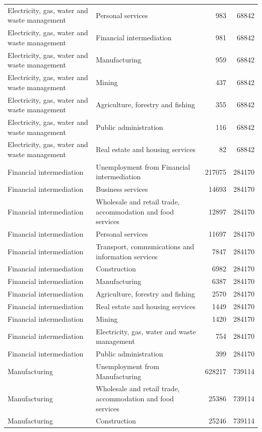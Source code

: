 \begin{longtable}{llrr}
Electricity, gas, water and waste management & Personal services & 983 & 68842 \\
Electricity, gas, water and waste management & Financial intermediation & 981 & 68842 \\
Electricity, gas, water and waste management & Manufacturing & 959 & 68842 \\
Electricity, gas, water and waste management & Mining & 437 & 68842 \\
Electricity, gas, water and waste management & Agriculture, forestry and fishing & 355 & 68842 \\
Electricity, gas, water and waste management & Public administration & 116 & 68842 \\
Electricity, gas, water and waste management & Real estate and housing services & 82 & 68842 \\
Financial intermediation & Unemployment from Financial intermediation & 217075 & 284170 \\
Financial intermediation & Business services & 14693 & 284170 \\
Financial intermediation & Wholesale and retail trade, accommodation and food services & 12897 & 284170 \\
Financial intermediation & Personal services & 11697 & 284170 \\
Financial intermediation & Transport, communications and information services & 7847 & 284170 \\
Financial intermediation & Construction & 6982 & 284170 \\
Financial intermediation & Manufacturing & 6387 & 284170 \\
Financial intermediation & Agriculture, forestry and fishing & 2570 & 284170 \\
Financial intermediation & Real estate and housing services & 1449 & 284170 \\
Financial intermediation & Mining & 1420 & 284170 \\
Financial intermediation & Electricity, gas, water and waste management & 754 & 284170 \\
Financial intermediation & Public administration & 399 & 284170 \\
Manufacturing & Unemployment from Manufacturing & 628217 & 739114 \\
Manufacturing & Wholesale and retail trade, accommodation and food services & 25386 & 739114 \\
Manufacturing & Construction & 25246 & 739114 \\

\end{longtable}
